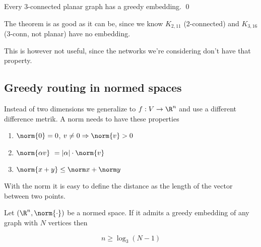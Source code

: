 \begin{thm} Every 3-connected planar graph has a greedy embedding. \qed\end{thm}

The theorem is as good as it can be, since we know $K_{2,11}$ (2-connected) and $K_{3,16}$ (3-conn, not planar) have no embedding.

This is however not useful, since the networks we're considering don't have that property.

\subsection{Greedy routing in normed spaces}

Instead of two dimensions we generalize to $f:V\rightarrow \R^n$ and use a different difference metrik. A norm needs to have these properties

\begin{enumerate}
\item $\norm{0} = 0$, $v\neq 0 \Rightarrow \norm{v} >0$
\item $\norm{\alpha v} = |\alpha | \cdot \norm{v}$
\item $\norm{x+y} \leq \norm x +\norm y$
\end{enumerate}

With the norm it is easy to define the distance as the length of the vector between two points.

\begin{lem} Let $(\R^n, \norm{\cdot})$ be a normed space. If it admits a greedy embedding of any graph with $N$ vertices then

\[n \geq \log_3(N-1)\]
\end{lem}

